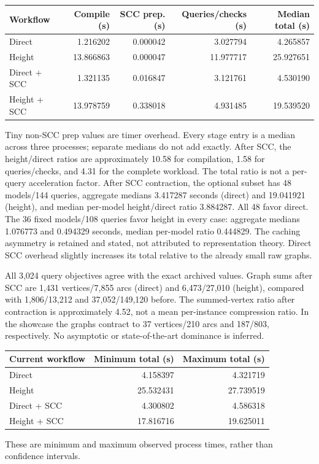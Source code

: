 \documentclass[10pt,letterpaper]{article}
\begin{document}
\begin{center}
\begin{tabular}{lrrrr}\toprule
Workflow & Compile (s) & SCC prep. (s) & Queries/checks (s) & Median total (s)\\\midrule
Direct &1.216202&0.000042&3.027794&4.265857\\
Height &13.866863&0.000047&11.977717&25.927651\\
Direct + SCC &1.321135&0.016847&3.121761&4.530190\\
Height + SCC &13.978759&0.338018&4.931485&19.539520\\\bottomrule
\end{tabular}
\end{center}
Tiny non-SCC prep values are timer overhead. Every stage entry is a median across three processes; separate medians do not add exactly. After SCC, the height/direct ratios are approximately 10.58 for compilation, 1.58 for queries/checks, and 4.31 for the complete workload. The total ratio is not a per-query acceleration factor. After SCC contraction, the optional subset has 48 models/144 queries, aggregate medians 3.417287 seconds (direct) and 19.041921 (height), and median per-model height/direct ratio 3.884287. All 48 favor direct. The 36 fixed models/108 queries favor height in every case: aggregate medians 1.076773 and 0.494329 seconds, median per-model ratio 0.444829. The caching asymmetry is retained and stated, not attributed to representation theory. Direct SCC overhead slightly increases its total relative to the already small raw graphs.

All 3,024 query objectives agree with the exact archived values. Graph sums after SCC are 1,431 vertices/7,855 arcs (direct) and 6,473/27,010 (height), compared with 1,806/13,212 and 37,052/149,120 before. The summed-vertex ratio after contraction is approximately 4.52, not a mean per-instance compression ratio. In the showcase the graphs contract to 37 vertices/210 arcs and 187/803, respectively. No asymptotic or state-of-the-art dominance is inferred.


\begin{center}
\begin{tabular}{lrr}\toprule
Current workflow & Minimum total (s) & Maximum total (s)\\\midrule
Direct&4.158397&4.321719\\
Height&25.532431&27.739519\\
Direct + SCC&4.300802&4.586318\\
Height + SCC&17.816716&19.625011\\
\bottomrule
\end{tabular}
\end{center}
These are minimum and maximum observed process times, rather than confidence intervals.
\end{document}

